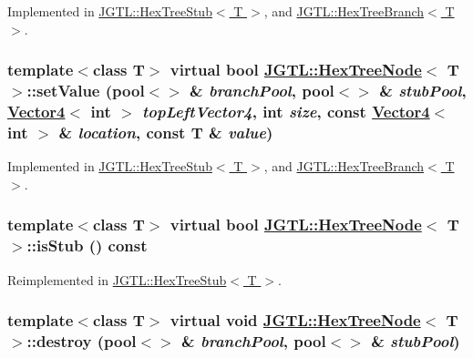 Implemented in \hyperlink{class_j_g_t_l_1_1_hex_tree_stub_7babf085fd8c43177bd5ad1e885b2ab5}{JGTL::Hex\-Tree\-Stub$<$ T $>$}, and \hyperlink{class_j_g_t_l_1_1_hex_tree_branch_25a53141349844dc869458f30db6f2a7}{JGTL::Hex\-Tree\-Branch$<$ T $>$}.\hypertarget{class_j_g_t_l_1_1_hex_tree_node_a65570f2ecf17f3537a8a726795b4152}{
\subsubsection[setValue]{\setlength{\rightskip}{0pt plus 5cm}template$<$class T$>$ virtual bool \hyperlink{class_j_g_t_l_1_1_hex_tree_node}{JGTL::Hex\-Tree\-Node}$<$ T $>$::set\-Value (pool$<$$>$ \& {\em branch\-Pool}, pool$<$$>$ \& {\em stub\-Pool}, \hyperlink{class_j_g_t_l_1_1_vector4}{Vector4}$<$ int $>$ {\em top\-Left\-Vector4}, int {\em size}, const \hyperlink{class_j_g_t_l_1_1_vector4}{Vector4}$<$ int $>$ \& {\em location}, const T \& {\em value})}}
\label{class_j_g_t_l_1_1_hex_tree_node_a65570f2ecf17f3537a8a726795b4152}




Implemented in \hyperlink{class_j_g_t_l_1_1_hex_tree_stub_0b7ce18da709ea3b283920b279b3a688}{JGTL::Hex\-Tree\-Stub$<$ T $>$}, and \hyperlink{class_j_g_t_l_1_1_hex_tree_branch_26769f998116310e9c17a03ee53f256c}{JGTL::Hex\-Tree\-Branch$<$ T $>$}.\hypertarget{class_j_g_t_l_1_1_hex_tree_node_4d37c24c8c3830953d2a9f195d7d26b5}{
\subsubsection[isStub]{\setlength{\rightskip}{0pt plus 5cm}template$<$class T$>$ virtual bool \hyperlink{class_j_g_t_l_1_1_hex_tree_node}{JGTL::Hex\-Tree\-Node}$<$ T $>$::is\-Stub () const}}
\label{class_j_g_t_l_1_1_hex_tree_node_4d37c24c8c3830953d2a9f195d7d26b5}




Reimplemented in \hyperlink{class_j_g_t_l_1_1_hex_tree_stub_f2ed502b7b1c2090642589b8ce1d637f}{JGTL::Hex\-Tree\-Stub$<$ T $>$}.\hypertarget{class_j_g_t_l_1_1_hex_tree_node_f093e463c1b3247b587370802caa98f2}{
\subsubsection[destroy]{\setlength{\rightskip}{0pt plus 5cm}template$<$class T$>$ virtual void \hyperlink{class_j_g_t_l_1_1_hex_tree_node}{JGTL::Hex\-Tree\-Node}$<$ T $>$::destroy (pool$<$$>$ \& {\em branch\-Pool}, pool$<$$>$ \& {\em stub\-Pool})}}
\label{class_j_g_t_l_1_1_hex_tree_node_f093e463c1b3247b587370802caa98f2}




